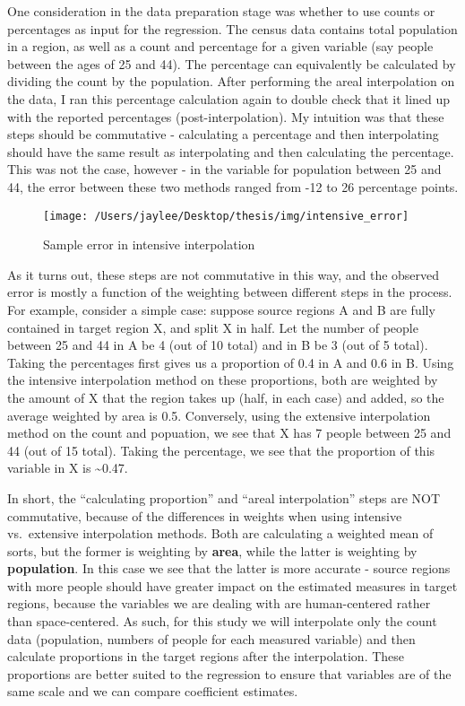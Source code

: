 \documentclass[12pt,twoside]{reedthesis}
\begin{document}
One consideration in the data preparation stage was whether to use counts or percentages as input for the regression. The census data contains total population in a region, as well as a count and percentage for a given variable (say people between the ages of 25 and 44). The percentage can equivalently be calculated by dividing the count by the population. After performing the areal interpolation on the data, I ran this percentage calculation again to double check that it lined up with the reported percentages (post-interpolation). My intuition was that these steps should be commutative - calculating a percentage and then interpolating should have the same result as interpolating and then calculating the percentage. This was not the case, however - in the variable for population between 25 and 44, the error between these two methods ranged from -12 to 26 percentage points.
\begin{figure}
\texttt{[image: /Users/jaylee/Desktop/thesis/img/intensive\_error]} \caption{Sample error in intensive interpolation}\label{fig:unnamed-chunk-5}
\end{figure}
As it turns out, these steps are not commutative in this way, and the observed error is mostly a function of the weighting between different steps in the process. For example, consider a simple case: suppose source regions A and B are fully contained in target region X, and split X in half. Let the number of people between 25 and 44 in A be 4 (out of 10 total) and in B be 3 (out of 5 total). Taking the percentages first gives us a proportion of 0.4 in A and 0.6 in B. Using the intensive interpolation method on these proportions, both are weighted by the amount of X that the region takes up (half, in each case) and added, so the average weighted by area is 0.5. Conversely, using the extensive interpolation method on the count and popuation, we see that X has 7 people between 25 and 44 (out of 15 total). Taking the percentage, we see that the proportion of this variable in X is \textasciitilde0.47.

In short, the ``calculating proportion'' and ``areal interpolation'' steps are NOT commutative, because of the differences in weights when using intensive vs.~extensive interpolation methods. Both are calculating a weighted mean of sorts, but the former is weighting by \textbf{area}, while the latter is weighting by \textbf{population}. In this case we see that the latter is more accurate - source regions with more people should have greater impact on the estimated measures in target regions, because the variables we are dealing with are human-centered rather than space-centered. As such, for this study we will interpolate only the count data (population, numbers of people for each measured variable) and then calculate proportions in the target regions after the interpolation. These proportions are better suited to the regression to ensure that variables are of the same scale and we can compare coefficient estimates.
\end{document}
